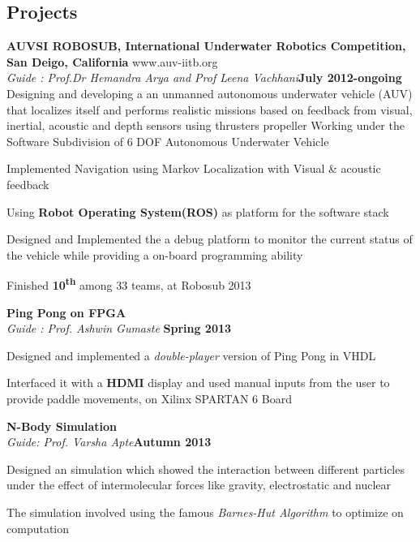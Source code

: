 \documentclass[margin,11pt]{resume}
\begin{document}
\begin{resume}
				\section{\mysidestyle Projects}
\textbf{AUVSI ROBOSUB, International Underwater Robotics Competition, San Deigo, California } \hfill www.auv-iitb.org
\vspace{1mm}\\ 
					\textsl{Guide : Prof.Dr Hemandra Arya and Prof Leena Vachhani}\hfill \textbf{July 2012-ongoing}\\Designing and developing a an unmanned autonomous underwater vehicle (AUV) that localizes itself and performs 	realistic missions based on feedback from visual, inertial, acoustic and depth sensors 	using thrusters\/ propeller 	
				Working under the Software Subdivision of 6 DOF Autonomous Underwater Vehicle 
				\begin{list2} 
				\item Implemented Navigation using Markov Localization with Visual \& acoustic feedback
				\item Using \textbf{Robot Operating System(ROS)} as platform for the software stack
				\item Designed and Implemented the a debug platform to monitor the current status of the vehicle while providing a on-board programming ability	
				\item Finished \textbf{10\textsuperscript{th}} among 33 teams, at Robosub 2013\vspace{-2.75mm} 
				\end{list2}
\textbf{Ping Pong on FPGA}\vspace{1mm} \hfill\\
\textsl{Guide : Prof. Ashwin Gumaste} \hfill \textbf{Spring 2013} \vspace{-4mm}\\ 
		 \begin{list2}
		 \item Designed and implemented a \emph{double-player} version of Ping Pong in VHDL 
		 \item Interfaced it with a \textbf{HDMI} display and  used manual inputs from the user to provide paddle movements, on Xilinx SPARTAN 6 Board  
				\end{list2}
\vspace{-2.75mm} 

\textbf{N-Body Simulation}\vspace{1mm} \hfill\\ 
\textsl{Guide: Prof. Varsha Apte}\hfill \textbf{Autumn 2013}\vspace{-5mm}\\
				\begin{list2}	
				\item Designed an simulation which showed the interaction between different particles under the effect of intermolecular forces like gravity, electrostatic and nuclear
				\item The simulation involved using the famous \emph{Barnes-Hut Algorithm} to optimize on computation
				\end{list2}\vspace{-2.75mm} 


\end{resume}
\end{document}
